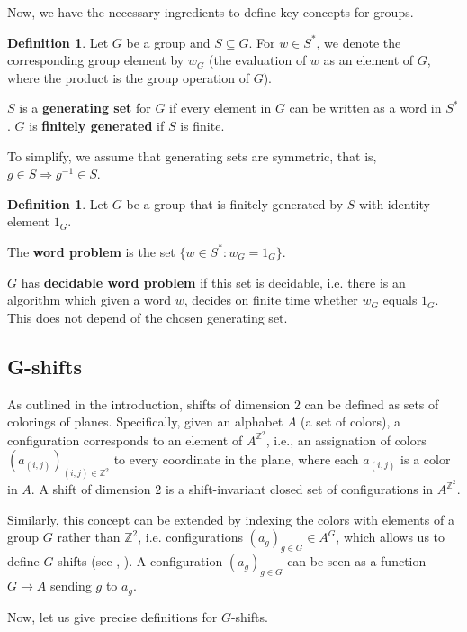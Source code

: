 \documentclass[french,american]{article}
\theoremstyle{plain}
\theoremstyle{definition}
\newtheorem{definition}[theorem]{Definition}
\theoremstyle{remark}
\theoremstyle{plain}
\begin{document}
Now, we have the necessary ingredients to define key concepts for
groups.
\begin{definition}
Let $G$ be a group and $S\subseteq G$. For $w\in S^{*}$,
we denote the corresponding group element by $w_{G}$ (the evaluation
of $w$ as an element of $G$, where the product is the group
operation of $G$). 

$S$ is a \textbf{generating set} for $G$ if every element in $G$
can be written as a word in $S^{*}$. $G$ is \textbf{finitely generated}
if $S$ is finite.
\end{definition}

To simplify, we assume that generating sets are symmetric, that is, $g\in S\Rightarrow g^{-1}\in S$.

\begin{definition}
Let $G$ be a group that is finitely generated by $S$ with identity element $1_G$.

The \textbf{word problem} is the set $\{w\in S^{*}:w_{G}=1_{G}\}$.

$G$ has \textbf{decidable word problem} if this set
is decidable, i.e. there is an algorithm which given a word $w$,
decides on finite time whether $w_{G}$ equals $1_{G}$. This does not depend of
the chosen generating set.
\end{definition}


\subsection{G-shifts}

As outlined in the introduction, shifts of dimension $2$ can be defined
as sets of colorings of planes. Specifically, given an alphabet $A$
(a set of colors), a configuration corresponds to an element of $A^{\mathbb{Z}^{2}}$,
i.e., an assignation of colors $(a_{(i,j)})_{(i,j)\in\mathbb{Z}^{2}}$ to every coordinate in the plane, where each $a_{(i,j)}$ is
a color in $A$. A shift of dimension $2$ is a shift-invariant closed
set of configurations in $A^{\mathbb{Z}^{2}}$.

Similarly, this concept can be extended by indexing the colors with
elements of a group $G$ rather than $\mathbb{Z}^{2}$, i.e. configurations
$(a_{g})_{g\in G} \in A^G$, which allows us to define $G$-shifts (see \cite{ceccherini2010cellular}, \cite{aubrun2018domino}).
A configuration $(a_{g})_{g\in G}$ can be seen as a function
$G\rightarrow A$ sending $g$ to $a_{g}$. 

Now, let us give precise definitions for $G$-shifts.
\end{document}
